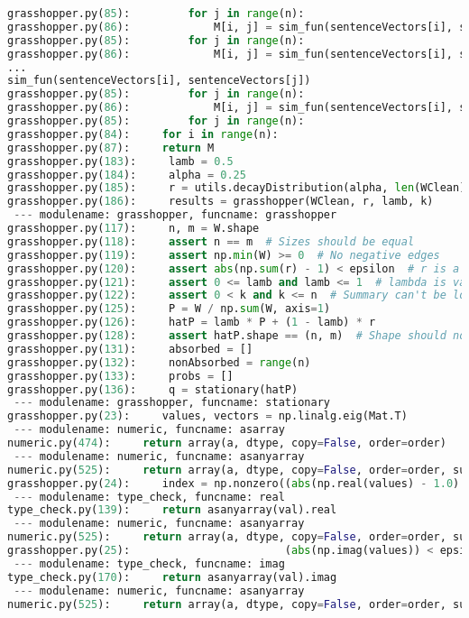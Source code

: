 \documentclass[11pt]{article}
\begin{document}
\begin{lstlisting}[language=Python]
grasshopper.py(85):         for j in range(n):
grasshopper.py(86):             M[i, j] = sim_fun(sentenceVectors[i], sentenceVectors[j])
grasshopper.py(85):         for j in range(n):
grasshopper.py(86):             M[i, j] = sim_fun(sentenceVectors[i], sentenceVectors[j])
...
sim_fun(sentenceVectors[i], sentenceVectors[j])
grasshopper.py(85):         for j in range(n):
grasshopper.py(86):             M[i, j] = sim_fun(sentenceVectors[i], sentenceVectors[j])
grasshopper.py(85):         for j in range(n):
grasshopper.py(84):     for i in range(n):
grasshopper.py(87):     return M
grasshopper.py(183):     lamb = 0.5
grasshopper.py(184):     alpha = 0.25
grasshopper.py(185):     r = utils.decayDistribution(alpha, len(WClean))
grasshopper.py(186):     results = grasshopper(WClean, r, lamb, k)
 --- modulename: grasshopper, funcname: grasshopper
grasshopper.py(117):     n, m = W.shape
grasshopper.py(118):     assert n == m  # Sizes should be equal
grasshopper.py(119):     assert np.min(W) >= 0  # No negative edges
grasshopper.py(120):     assert abs(np.sum(r) - 1) < epsilon  # r is a distribution
grasshopper.py(121):     assert 0 <= lamb and lamb <= 1  # lambda is valid
grasshopper.py(122):     assert 0 < k and k <= n  # Summary can't be longer than document!
grasshopper.py(125):     P = W / np.sum(W, axis=1)
grasshopper.py(126):     hatP = lamb * P + (1 - lamb) * r
grasshopper.py(128):     assert hatP.shape == (n, m)  # Shape should not change!
grasshopper.py(131):     absorbed = []
grasshopper.py(132):     nonAbsorbed = range(n)
grasshopper.py(133):     probs = []
grasshopper.py(136):     q = stationary(hatP)
 --- modulename: grasshopper, funcname: stationary
grasshopper.py(23):     values, vectors = np.linalg.eig(Mat.T)
 --- modulename: numeric, funcname: asarray
numeric.py(474):     return array(a, dtype, copy=False, order=order)
 --- modulename: numeric, funcname: asanyarray
numeric.py(525):     return array(a, dtype, copy=False, order=order, subok=True)
grasshopper.py(24):     index = np.nonzero((abs(np.real(values) - 1.0) < epsilon) &
 --- modulename: type_check, funcname: real
type_check.py(139):     return asanyarray(val).real
 --- modulename: numeric, funcname: asanyarray
numeric.py(525):     return array(a, dtype, copy=False, order=order, subok=True)
grasshopper.py(25):                        (abs(np.imag(values)) < epsilon))[0][0]
 --- modulename: type_check, funcname: imag
type_check.py(170):     return asanyarray(val).imag
 --- modulename: numeric, funcname: asanyarray
numeric.py(525):     return array(a, dtype, copy=False, order=order, subok=True)

\end{lstlisting}
\end{document}

